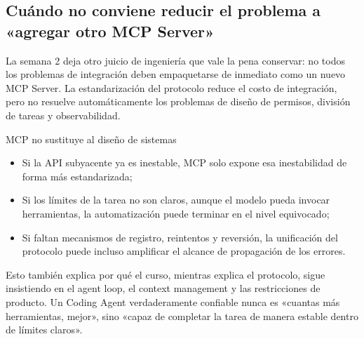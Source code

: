 \subsection{Cuándo no conviene reducir el problema a «agregar otro MCP Server»}
La semana 2 deja otro juicio de ingeniería que vale la pena conservar: no todos los problemas de integración deben empaquetarse de inmediato como un nuevo MCP Server. La estandarización del protocolo reduce el costo de integración, pero no resuelve automáticamente los problemas de diseño de permisos, división de tareas y observabilidad.

\begin{warningbox}{MCP no sustituye al diseño de sistemas}
\begin{itemize}
    \item Si la API subyacente ya es inestable, MCP solo expone esa inestabilidad de forma más estandarizada;
    \item Si los límites de la tarea no son claros, aunque el modelo pueda invocar herramientas, la automatización puede terminar en el nivel equivocado;
    \item Si faltan mecanismos de registro, reintentos y reversión, la unificación del protocolo puede incluso amplificar el alcance de propagación de los errores.
\end{itemize}
\end{warningbox}

Esto también explica por qué el curso, mientras explica el protocolo, sigue insistiendo en el agent loop, el context management y las restricciones de producto. Un Coding Agent verdaderamente confiable nunca es «cuantas más herramientas, mejor», sino «capaz de completar la tarea de manera estable dentro de límites claros».
